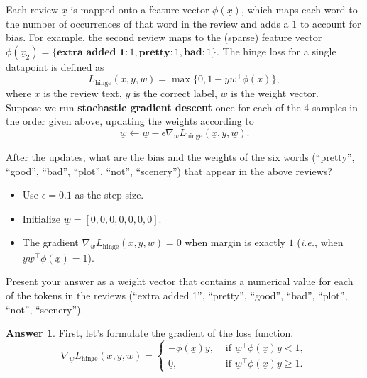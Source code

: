\documentclass{article}
\renewcommand{\vec}[1]{\underline{#1}}
\theoremstyle{definition}
\newtheorem*{answer}{Answer}
\begin{document}
\begin{question}[start=0]
		Each review $\underline{x}$ is mapped onto a feature vector $\phi(\underline{x})$, which maps each word to the number of occurrences of that word in the review and adds a $1$ to account for bias. For example, the second review maps to the (sparse) feature vector $\phi(\underline{x}_2)=\{\textbf{extra added 1}:1, \textbf{pretty}:1,\textbf{bad}:1\}$. The hinge loss for a single datapoint is defined as
		\begin{equation*}
			L_{\text{hinge}}(\underline{x}, y,\underline{w})= \max\{0, 1-y\underline{w}^\top\phi(\underline{x})\},
		\end{equation*}
		where $\underline{x}$ is the review text, $y$ is the correct label, $\underline{w}$ is the weight vector.\\

		Suppose we run \textbf{stochastic gradient descent} once for each of the 4 samples in the order given above, updating the weights according to
		\begin{equation*}
			\underline{w} \leftarrow \underline{w} - \epsilon \nabla_{\underline{w}} L_{\text{hinge}}(\underline{x}, y, \underline{w}).
		\end{equation*}
		
		After the updates, what are the bias and the weights of the six words (``pretty'', ``good'', ``bad'', ``plot'', ``not'', ``scenery'') that appear in the above reviews?
		\begin{itemize}
			\item Use $\epsilon=0.1$ as the step size.
			\item Initialize $\underline{w}=[0,0,0,0,0,0,0]$.
			\item The gradient $\nabla_{\underline{w}} L_{\text{hinge}}(\underline{x}, y, \underline{w})=\underline{0}$ when margin is exactly $1$ (\emph{i.e.}, when $y\underline{w}^\top\phi(\underline{x}) = 1$).
		\end{itemize}
		
		Present your answer as a weight vector that contains a numerical value for each of the tokens in the reviews  (``extra added 1'', ``pretty'', ``good'', ``bad'', ``plot'', ``not'', ``scenery'').
		\begin{answer}
			First, let's formulate the gradient of the loss function.
			\begin{equation*}
				\nabla_{\underline{w}} L_{\text{hinge}}(\underline{x}, y, \underline{w}) = \begin{cases}
						-\phi(\underline{x})y, & \text{ if } \underline{w}^\top\phi(\underline{x})y < 1,\\
						\vec{0}, & \text{ if } \underline{w}^\top\phi(\underline{x})y \geq 1.
					\end{cases}
				\end{equation*}
			

\end{answer}
\end{question}
\end{document}
